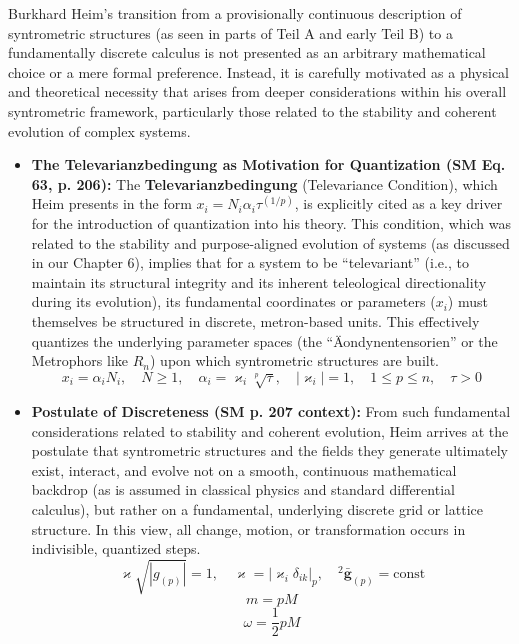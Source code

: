 \documentclass[12pt]{article}
\newcommand{\q}[1]{\enquote{#1}}
\newcommand{\semantischermetrophor}{R_n}
\begin{document}
Burkhard Heim's transition from a provisionally continuous description of syntrometric structures (as seen in parts of Teil A and early Teil B) to a fundamentally discrete calculus is not presented as an arbitrary mathematical choice or a mere formal preference. Instead, it is carefully motivated as a physical and theoretical necessity that arises from deeper considerations within his overall syntrometric framework, particularly those related to the stability and coherent evolution of complex systems.

\begin{itemize}
    \item \textbf{The Televarianzbedingung as Motivation for Quantization (SM Eq. 63, p. 206):}
    The \textbf{Televarianzbedingung} (Televariance Condition), which Heim presents in the form \( x_i = N_i \alpha_i \tau^{(1/p)} \), is explicitly cited as a key driver for the introduction of quantization into his theory. This condition, which was related to the stability and purpose-aligned evolution of systems (as discussed in our Chapter 6), implies that for a system to be \q{televariant} (i.e., to maintain its structural integrity and its inherent teleological directionality during its evolution), its fundamental coordinates or parameters (\(x_i\)) must themselves be structured in discrete, metron-based units. This effectively quantizes the underlying parameter spaces (the \q{Äondynentensorien} or the Metrophors like \( \semantischermetrophor \)) upon which syntrometric structures are built.
    \begin{equation}
    x_i = \alpha_i N_i, \quad N \ge 1, \quad \alpha_i = \varkappa_i \sqrt[p]{\tau}, \quad |\varkappa_i| = 1, \quad 1 \le p \le n, \quad \tau > 0 \tag{63}
    \end{equation}

    \item \textbf{Postulate of Discreteness (SM p. 207 context):}
    From such fundamental considerations related to stability and coherent evolution, Heim arrives at the postulate that syntrometric structures and the fields they generate ultimately exist, interact, and evolve not on a smooth, continuous mathematical backdrop (as is assumed in classical physics and standard differential calculus), but rather on a fundamental, underlying discrete grid or lattice structure. In this view, all change, motion, or transformation occurs in indivisible, quantized steps.
    \begin{equation}
    \varkappa \sqrt{|g_{(p)}|} = 1, \quad \varkappa = |\varkappa_i \delta_{ik}|_p, \quad {}^2\bar{\mathbf{g}}_{(p)} = \text{const} \tag{64}
    \end{equation}
    \begin{equation}
    m = p M \tag{65}
    \end{equation}
    \begin{equation}
    \omega = \frac{1}{2} p M \tag{65a}
    \end{equation}


\end{itemize}
\end{document}
